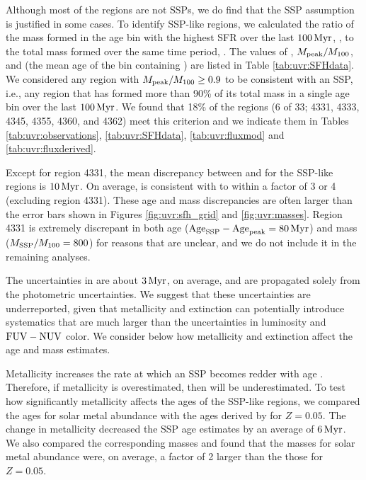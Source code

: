 Although most of the regions are not SSPs, we do find that the SSP assumption
is justified in some cases. To identify SSP-like regions, we calculated the
ratio of the mass formed in the age bin with the highest SFR over the last
$100\,\mathrm{Myr}$, \masspeak{}, to the total mass formed over the same
time period, \massoneh{}. The values of \masspeak{},
$M_{\mathrm{peak}} / M_{100}$, and \agepeak{} (the mean age of the bin
containing \masspeak{}) are listed in Table \ref{tab:uvr:SFHdata}. We
considered any region with $M_{\mathrm{peak}} / M_{100} \ge 0.9$ to be consistent
with an SSP, i.e., any region that has formed more than 90\% of its total mass
in a single age bin over the last $100\,\mathrm{Myr}$. We found that 18\% of
the regions (6 of 33; 4331, 4333, 4345, 4355, 4360, and 4362) meet this
criterion and we indicate them in Tables \ref{tab:uvr:observations},
\ref{tab:uvr:SFHdata}, \ref{tab:uvr:fluxmod} and \ref{tab:uvr:fluxderived}.

Except for region 4331, the mean discrepancy between \agessp{} and
\agepeak{} for the SSP-like regions is $10\,\mathrm{Myr}$. On
average, \massssp{} is consistent with \massoneh{} to within a factor of 3
or 4 (excluding region 4331). These age and mass discrepancies are often larger
than the error bars shown in Figures \ref{fig:uvr:sfh_grid} and \ref{fig:uvr:masses}.
Region 4331 is extremely discrepant in both age ($\mathrm{Age}_{\mathrm{SSP}} -
\mathrm{Age}_{\mathrm{peak}} = 80\,\mathrm{Myr}$) and mass ($M_{\mathrm{SSP}} / M_{100} = 800$) for
reasons that are unclear, and we do not include it in the remaining analyses.

The uncertainties in \agessp{} are about $3\,\mathrm{Myr}$, on
average, and are propagated solely from the photometric uncertainties. We
suggest that these uncertainties are underreported, given that metallicity and
extinction can potentially introduce systematics that are much larger than the
uncertainties in \fuv{} luminosity and $\mathrm{FUV} - \mathrm{NUV}$ color. We consider below
how metallicity and extinction affect the age and mass estimates.

Metallicity increases the rate at which an SSP becomes redder with age
\citep{Bianchi:2011, Kang:2009}. Therefore, if metallicity is overestimated, then
\agessp{} will be underestimated. To test how significantly
metallicity affects the ages of the SSP-like regions, we compared the ages for
solar metal abundance with the ages derived by  for
$Z=0.05$. The change in metallicity decreased the SSP age estimates by an
average of $6\,\mathrm{Myr}$. We also compared the corresponding masses and
found that the masses for solar metal abundance were, on average, a factor of 2
larger than the those for $Z=0.05$.

